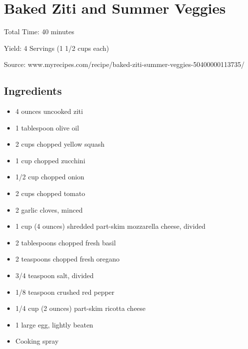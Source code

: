 \section{Baked Ziti and Summer Veggies}

\begin{center}
\noindent Total Time: 40 minutes

Yield: 4 Servings (1 1/2 cups each)

\vspace{1em}

Source: www.myrecipes.com/recipe/baked-ziti-summer-veggies-50400000113735/
\end{center}

\subsection{Ingredients}
\begin{multicols}{2}
\begin{itemize}
    \item 4 ounces uncooked ziti
    \item 1 tablespoon olive oil
    \item 2 cups chopped yellow squash
    \item 1 cup chopped zucchini
    \item 1/2 cup chopped onion
    \item 2 cups chopped tomato
    \item 2 garlic cloves, minced
    \item 1 cup (4 ounces) shredded part-skim mozzarella cheese, divided
    \item 2 tablespoons chopped fresh basil
    \item 2 teaspoons chopped fresh oregano
    \item 3/4 teaspoon salt, divided
    \item 1/8 teaspoon crushed red pepper
    \item 1/4 cup (2 ounces) part-skim ricotta cheese
    \item 1 large egg, lightly beaten
    \item Cooking spray
\end{itemize}
\end{multicols}

